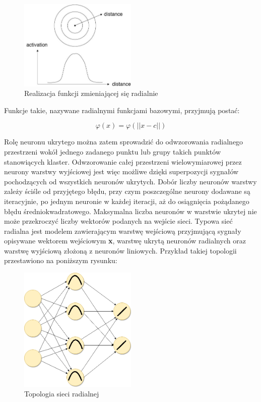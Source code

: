 \documentclass[12pt]{article}
\begin{document}
\begin{figure}[h!]
\centering
	\includegraphics[width=0.5\textwidth]{rbf-gauss.jpeg}\par\vspace{1cm}
\caption{Realizacja funkcji zmieniającej się radialnie}
	\label{fig:features}
\end{figure}

Funkcje takie, nazywane radialnymi funkcjami bazowymi, przyjmują postać: 

\[ \varphi(x) = \varphi(||x-c||) \]

Rolę neuronu ukrytego można zatem sprowadzić do odwzorowania radialnego przestrzeni wokół jednego zadanego punktu lub grupy takich punktów stanowiących klaster. Odwzorowanie całej przestrzeni wielowymiarowej przez neurony warstwy wyjściowej jest więc możliwe dzięki superpozycji sygnałów pochodzących od wszystkich neuronów ukrytych. Dobór liczby neuronów warstwy zależy ściśle od przyjętego błędu, przy czym poszczególne neurony dodawane są iteracyjnie, po jednym neuronie w każdej iteracji, aż do osiągnięcia pożądanego błędu średniokwadratowego. Maksymalna liczba neuronów w warstwie ukrytej nie może przekroczyć  liczby wektorów podanych na wejście sieci. Typowa sieć radialna jest modelem zawierającym warstwę wejściową przyjmującą sygnały opisywane wektorem wejściowym \textbf{x}, warstwę ukrytą neuronów radialnych oraz warstwę wyjściową złożoną z neuronów liniowych. Przykład takiej topologii przestawiono na poniższym rysunku:

\begin{figure}[h!]
\centering
	\includegraphics[width=0.5\textwidth]{rbf.png}\par\vspace{1cm}
\caption{Topologia sieci radialnej}
	\label{fig:features}
\end{figure}
\end{document}
